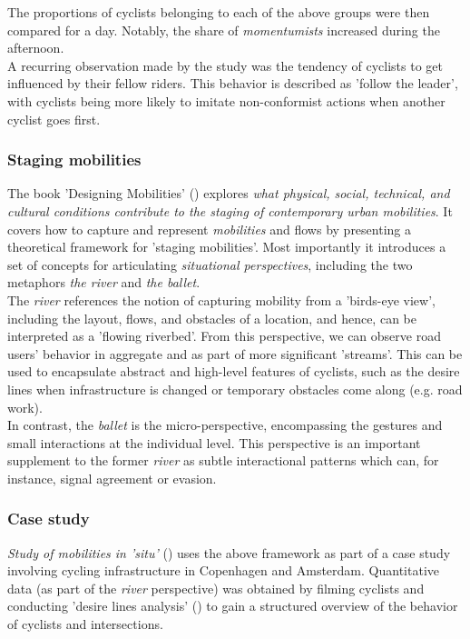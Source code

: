 The proportions of cyclists belonging to each of the above groups were then compared for a day. 
Notably, the share of \textit{momentumists} increased during the afternoon.
 \ \\

A recurring observation made by the study was the tendency of cyclists to get influenced by their fellow riders. 
This behavior is described as 'follow the leader', with cyclists being more likely to imitate non-conformist 
actions when another cyclist goes first. 

\subsubsection{Staging mobilities}
The book 'Designing Mobilities' (\cite{designinig_mobilities}) explores \textit{what physical, social, technical, 
and cultural conditions contribute to the staging of contemporary urban mobilities}.
It covers how to capture and represent \textit{mobilities} and flows by presenting a theoretical framework for 'staging mobilities'. 
Most importantly it introduces a set of concepts for articulating \textit{situational perspectives}, 
including the two metaphors \textit{the river} and \textit{the ballet}. 
 \ \\

 The \textit{river} references the notion of capturing mobility from a 'birds-eye view', including the layout, 
 flows, and obstacles of a location, and hence, can be interpreted as a 'flowing riverbed'. 
 From this perspective, we can observe road users' behavior in aggregate and as part of more significant 'streams'. 
 This can be used to encapsulate abstract and high-level features of cyclists, such as the desire lines
 when infrastructure is changed or temporary obstacles come along (e.g. road work).
 \ \\

In contrast, the \textit{ballet} is the micro-perspective, encompassing the gestures and small interactions at the individual level.
This perspective is an important supplement to the former \textit{river} as subtle interactional patterns which can, for instance,
 signal agreement or evasion.

\subsubsection{Case study}
\textit{Study of mobilities in 'situ'} (\cite{situ}) uses the above framework as part of a case study involving cycling infrastructure in 
Copenhagen and Amsterdam. Quantitative data (as part of the \textit{river} perspective) was obtained by filming cyclists and conducting 
'desire lines analysis' (\cite{cva}) to gain a structured overview of the behavior of cyclists and intersections. 


